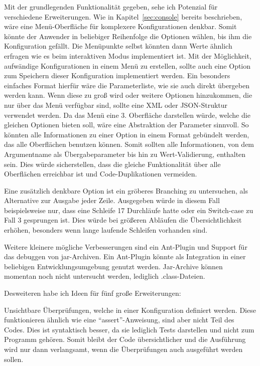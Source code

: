 Mit der grundlegenden Funktionalität gegeben, sehe ich Potenzial für verschiedene Erweiterungen.
Wie in Kapitel~\ref{sec:console} bereits beschrieben, wäre eine Menü-Oberfläche für komplexere Konfigurationen denkbar. Somit könnte der Anwender in beliebiger Reihenfolge die Optionen wählen, bis ihm die Konfiguration gefällt. Die Menüpunkte selbst könnten dann Werte ähnlich erfragen wie es beim interaktiven Modus implementiert ist.
Mit der Möglichkeit, aufwändige Konfigurationen in einem Menü zu erstellen, sollte auch eine Option zum Speichern dieser Konfiguration implementiert werden. Ein besonders einfaches Format hierfür wäre die Parameterliste, wie sie auch direkt übergeben werden kann. Wenn diese zu groß wird oder weitere Optionen hinzukommen, die nur über das Menü verfügbar sind, sollte eine XML oder JSON-Struktur verwendet werden.
Da das Menü eine 3. Oberfläche darstellen würde, welche die gleichen Optionen bieten soll, wäre eine Abstraktion der Parameter sinnvoll. So könnten alle Informationen zu einer Option in einem Format gebündelt werden, das alle Oberflächen benutzen können. Somit sollten alle Informationen, von dem Argumentname als Übergabeparameter bis hin zu Wert-Validierung, enthalten sein. Dies würde sicherstellen, dass die gleiche Funktionalität über alle Oberflächen erreichbar ist und Code-Duplikationen vermeiden.

Eine zusätzlich denkbare Option ist ein gröberes Branching zu untersuchen, als Alternative zur Ausgabe jeder Zeile. Ausgegeben würde in diesem Fall beispielsweise nur, dass eine Schleife 17 Durchläufe hatte oder ein Switch-case zu Fall 3 gesprungen ist.
Dies würde bei größeren Abläufen die Übersichtlichkeit erhöhen, besonders wenn lange laufende Schleifen vorhanden sind.

Weitere kleinere mögliche Verbesserungen sind ein Ant-Plugin und Support für das debuggen von jar-Archiven. Ein Ant-Plugin könnte als Integration in einer beliebigen Entwicklungsumgebung genutzt werden. Jar-Archive können momentan noch nicht untersucht werden, lediglich .class-Dateien.

Desweiteren habe ich Ideen für fünf große Erweiterungen:

Unsichtbare Überprüfungen, welche in einer Konfiguration definiert werden. Diese funktionieren ähnlich wie eine "`assert"'-Anweisung, sind aber nicht Teil des Codes. Dies ist syntaktisch besser, da sie lediglich Tests darstellen und nicht zum Programm gehören. Somit bleibt der Code übersichtlicher und die Ausführung wird nur dann verlangsamt, wenn die Überprüfungen auch ausgeführt werden sollen.

